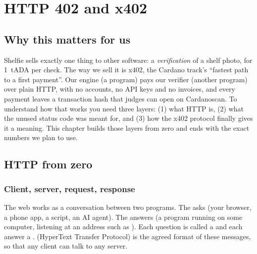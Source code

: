 \chapter{HTTP 402 and x402}

\section*{Why this matters for us}
Shelfie sells exactly one thing to other software: a \emph{verification} of a shelf photo, for 1~tADA per check. The way we sell it is x402, the Cardano track's ``fastest path to a first payment''. Our engine (a program) pays our verifier (another program) over plain HTTP, with no accounts, no API keys and no invoices, and every payment leaves a transaction hash that judges can open on Cardanoscan. To understand how that works you need three layers: (1) what HTTP is, (2) what the unused status code  was meant for, and (3) how the x402 protocol finally gives it a meaning. This chapter builds those layers from zero and ends with the exact numbers we plan to use.

\section{HTTP from zero}
\subsection{Client, server, request, response}
The web works as a conversation between two programs. The  asks (your browser, a phone app, a script, an AI agent). The  answers (a program running on some computer, listening at an address such as ). Each question is called a  and each answer a .  (HyperText Transfer Protocol) is the agreed format of these messages, so that any client can talk to any server.

\begin{center}
\end{center}

